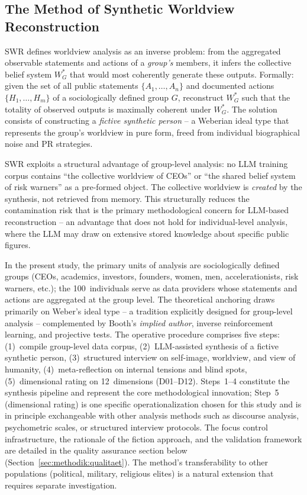 \documentclass[12pt,a4paper]{article}
\begin{document}
\subsection{The Method of Synthetic Worldview Reconstruction}
\label{sec:methodik:swr}

SWR defines worldview analysis as an inverse problem: from the aggregated observable statements and actions of a \emph{group's} members, it infers the collective belief system $W_G^*$ that would most coherently generate these outputs. Formally: given the set of all public statements $\{A_1, \ldots, A_n\}$ and documented actions $\{H_1, \ldots, H_m\}$ of a sociologically defined group $G$, reconstruct $W_G^*$ such that the totality of observed outputs is maximally coherent under $W_G^*$. The solution consists of constructing a \emph{fictive synthetic person} -- a Weberian ideal type that represents the group's worldview in pure form, freed from individual biographical noise and PR strategies.

SWR exploits a structural advantage of group-level analysis: no LLM training corpus contains ``the collective worldview of CEOs'' or ``the shared belief system of risk warners'' as a pre-formed object. The collective worldview is \emph{created} by the synthesis, not retrieved from memory. This structurally reduces the contamination risk that is the primary methodological concern for LLM-based reconstruction -- an advantage that does not hold for individual-level analysis, where the LLM may draw on extensive stored knowledge about specific public figures.

In the present study, the primary units of analysis are sociologically defined groups (CEOs, academics, investors, founders, women, men, accelerationists, risk warners, etc.); the 100~individuals serve as data providers whose statements and actions are aggregated at the group level. The theoretical anchoring draws primarily on Weber's ideal type -- a tradition explicitly designed for group-level analysis -- complemented by Booth's \emph{implied author}, inverse reinforcement learning, and projective tests. The operative procedure comprises five steps: (1)~compile group-level data corpus, (2)~LLM-assisted synthesis of a fictive synthetic person, (3)~structured interview on self-image, worldview, and view of humanity, (4)~meta-reflection on internal tensions and blind spots, (5)~dimensional rating on 12~dimensions (D01--D12). Steps~1--4 constitute the synthesis pipeline and represent the core methodological innovation; Step~5 (dimensional rating) is one specific operationalization chosen for this study and is in principle exchangeable with other analysis methods such as discourse analysis, psychometric scales, or structured interview protocols. The focus control infrastructure, the rationale of the fiction approach, and the validation framework are detailed in the quality assurance section below (Section~\ref{sec:methodik:qualitaet}). The method's transferability to other populations (political, military, religious elites) is a natural extension that requires separate investigation.
\end{document}
